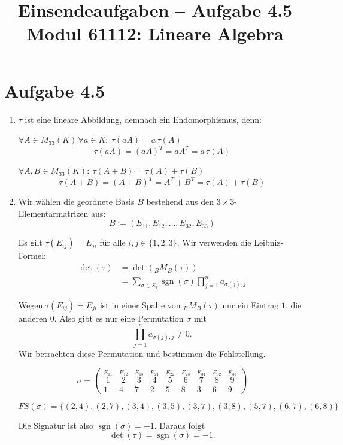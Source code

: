 \documentclass[a4paper,12pt]{article}
\title{Einsendeaufgaben -- Aufgabe 4.5\\[0.5em]
\large Modul 61112: Lineare Algebra}
\author{}
\date{}
\begin{document}
\maketitle

\section*{Aufgabe 4.5}

\begin{enumerate}[label=\alph*)]
  \item
  $\tau$ ist eine lineare Abbildung, demnach ein Endomorphismus, denn:

  \medskip

  $\forall A \in M_{33}(K) \, \forall a \in K: \ \tau(aA) = a\,\tau(A)$
  \[
    \tau(aA) = (aA)^T = a A^T = a\,\tau(A)
  \]

  $\forall A, B \in M_{33}(K): \ \tau(A+B) = \tau(A) + \tau(B)$
  \[
    \tau(A+B) = (A+B)^T = A^T + B^T = \tau(A) + \tau(B)
  \]

  \item
  Wir wählen die geordnete Basis $B$ bestehend aus den $3 \times 3$-Elementarmatrizen
  aus:
  \[
    B := (E_{11}, E_{12}, \ldots, E_{32}, E_{33})
  \]

  Es gilt $\tau(E_{ij}) = E_{ji}$ für alle $i, j \in \{1, 2, 3\}$. Wir verwenden die
  Leibniz-Formel:
  \begin{align*}
    \det(\tau) &= \det({}_B M_B(\tau)) \\
            &= \sum_{\sigma \in S_9} \operatorname{sgn}(\sigma) \prod_{j=1}^{n} a_{\sigma(j), j}
  \end{align*}

  Wegen $\tau(E_{ij}) = E_{ji}$ ist in einer Spalte von ${}_B M_B(\tau)$ nur ein Eintrag $1$,
  die anderen $0$. Also gibt es nur eine Permutation $\sigma$ mit
  \[
    \prod_{j=1}^{n} a_{\sigma(j), j} \neq 0.
  \]
  Wir betrachten diese Permutation und bestimmen die Fehlstellung.

  \[
    \sigma = \begin{pmatrix}
      \overset{E_{11}}{1} & \overset{E_{12}}{2} & \overset{E_{13}}{3} & \overset{E_{21}}{4} & \overset{E_{22}}{5} & \overset{E_{23}}{6} & \overset{E_{31}}{7} & \overset{E_{32}}{8} & \overset{E_{33}}{9} \\
      1 & 4 & 7 & 2 & 5 & 8 & 3 & 6 & 9
    \end{pmatrix}
  \]

  \[
    FS(\sigma) = \{(2,4), (2,7), (3,4), (3,5), (3,7), (3,8), (5,7), (6,7), (6,8)\}
  \]

  Die Signatur ist also $\operatorname{sgn}(\sigma) = -1$. Daraus folgt
  \[
    \det(\tau) = \operatorname{sgn}(\sigma) = -1.
  \]
\end{enumerate}
\end{document}
